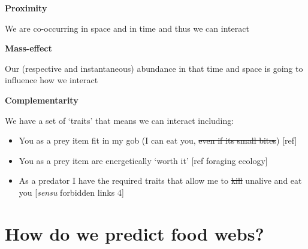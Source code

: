 \documentclass[
]{article}
\providecommand{\tightlist}{%
  \setlength{\itemsep}{0pt}\setlength{\parskip}{0pt}}\usepackage{longtable,booktabs,array}
\begin{document}
\begin{tcolorbox}[enhanced jigsaw, toprule=.15mm, opacitybacktitle=0.6, leftrule=.75mm, bottomtitle=1mm, title=\textcolor{quarto-callout-note-color}{\faInfo}\hspace{0.5em}{Box 1 - Mechanisms that determine feeding links}, breakable, colbacktitle=quarto-callout-note-color!10!white, colback=white, titlerule=0mm, colframe=quarto-callout-note-color-frame, left=2mm, bottomrule=.15mm, coltitle=black, rightrule=.15mm, toptitle=1mm, arc=.35mm, opacityback=0]

\textbf{Proximity}

We are co-occurring in space and in time and thus we can interact

\textbf{Mass-effect}

Our (respective and instantaneous) abundance in that time and space is
going to influence how we interact

\textbf{Complementarity}

We have a set of `traits' that means we can interact including:

\begin{itemize}
\tightlist
\item
  You as a prey item fit in my gob (I can eat you, \st{even if its small
  bites}) {[}ref{]}
\item
  You as a prey item are energetically `worth it' {[}ref foraging
  ecology{]}
\item
  As a predator I have the required traits that allow me to \st{kill}
  unalive and eat you {[}\emph{sensu} forbidden links 4{]}
\end{itemize}

\end{tcolorbox}

\section{How do we predict food webs?}\label{sec-network-build}
\end{document}
